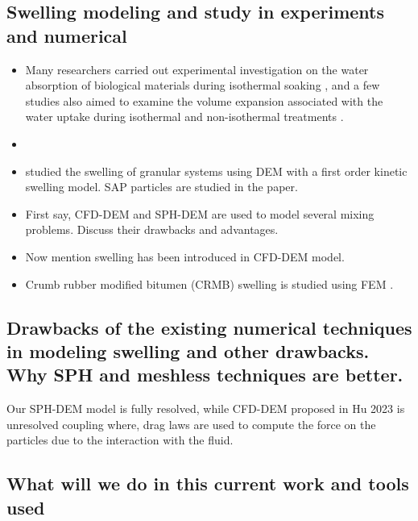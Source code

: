 \documentclass[preprint,12pt]{elsarticle}
\begin{document}
\subsection*{Swelling modeling and study in experiments and numerical}

\begin{itemize}
\item Many researchers carried out experimental investigation on the water
  absorption of biological materials during isothermal soaking
  \cite{kashaninejad2007study,shittu2012physical}, and a few studies also
  aimed to examine the volume expansion associated with the water uptake
  during isothermal \cite{perez2012modeling} and non-isothermal treatments
  \cite{palanisamy2020kinetic}.

\item

\item \cite{braile2022analysis} studied the swelling of granular systems using
  DEM with a first order kinetic swelling model. SAP particles are studied in
  the paper.
\item First say, CFD-DEM and SPH-DEM are used to model several mixing
  problems. Discuss their drawbacks and advantages.
\item Now mention swelling has been introduced in CFD-DEM model.
\end{itemize}



\begin{itemize}
\item Crumb rubber modified bitumen (CRMB) swelling is studied using FEM
  \cite{wang2019numerical}.
\end{itemize}


\subsection*{Drawbacks of the existing numerical techniques in modeling
  swelling and other drawbacks. Why SPH and meshless techniques are better.}
Our SPH-DEM model is fully resolved, while CFD-DEM proposed in Hu 2023 is
unresolved coupling where, drag laws are used to compute the force on the
particles due to the interaction with the fluid.

\subsection*{What will we do in this current work and tools used}
\end{document}

